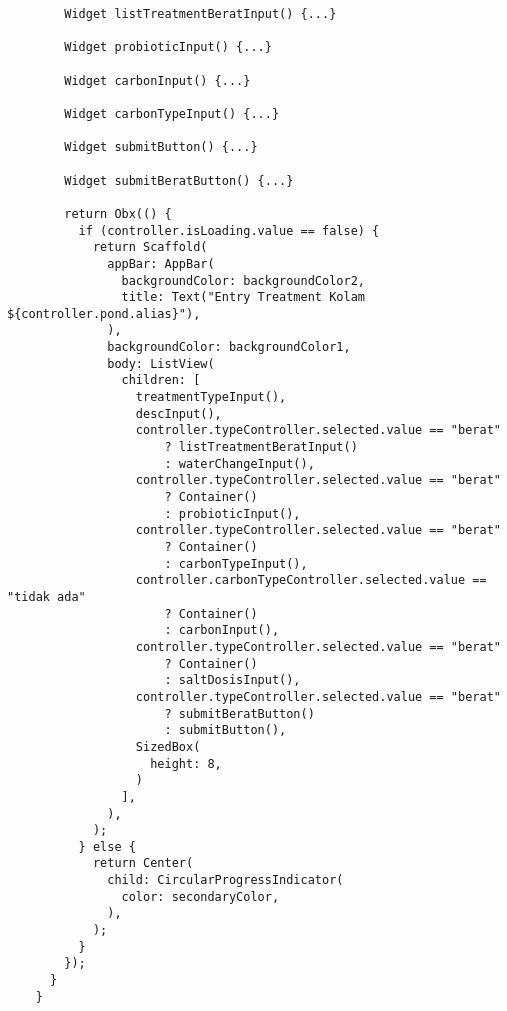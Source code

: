 \begin{lstlisting}
        Widget listTreatmentBeratInput() {...}
    
        Widget probioticInput() {...}
    
        Widget carbonInput() {...}
    
        Widget carbonTypeInput() {...}
    
        Widget submitButton() {...}
    
        Widget submitBeratButton() {...}
    
        return Obx(() {
          if (controller.isLoading.value == false) {
            return Scaffold(
              appBar: AppBar(
                backgroundColor: backgroundColor2,
                title: Text("Entry Treatment Kolam ${controller.pond.alias}"),
              ),
              backgroundColor: backgroundColor1,
              body: ListView(
                children: [
                  treatmentTypeInput(),
                  descInput(),
                  controller.typeController.selected.value == "berat"
                      ? listTreatmentBeratInput()
                      : waterChangeInput(),
                  controller.typeController.selected.value == "berat"
                      ? Container()
                      : probioticInput(),
                  controller.typeController.selected.value == "berat"
                      ? Container()
                      : carbonTypeInput(),
                  controller.carbonTypeController.selected.value == "tidak ada"
                      ? Container()
                      : carbonInput(),
                  controller.typeController.selected.value == "berat"
                      ? Container()
                      : saltDosisInput(),
                  controller.typeController.selected.value == "berat"
                      ? submitBeratButton()
                      : submitButton(),
                  SizedBox(
                    height: 8,
                  )
                ],
              ),
            );
          } else {
            return Center(
              child: CircularProgressIndicator(
                color: secondaryColor,
              ),
            );
          }
        });
      }
    }

	\end{lstlisting}



